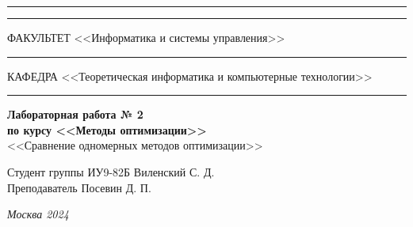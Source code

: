 \documentclass[a4paper, 14pt]{extarticle}
\begin{document}
\begin{titlepage}
\vspace{-25pt}
\hspace{-35pt}\rule{\textwidth}{2.3pt}

\vspace*{-20.3pt}
\hspace{-35pt}\rule{\textwidth}{0.4pt}

\vspace{1.5ex}
\hspace{-35pt} \noindent \small ФАКУЛЬТЕТ\hspace{80pt} <<Информатика и системы управления>>

\vspace*{-16pt}
\hspace{47pt}\rule{0.83\textwidth}{0.4pt}

\vspace{0.5ex}
\hspace{-35pt} \noindent \small КАФЕДРА\hspace{50pt} <<Теоретическая информатика и компьютерные технологии>>

\vspace*{-16pt}
\hspace{30pt}\rule{0.866\textwidth}{0.4pt}
  
\vspace{11em}

\begin{center}
\Large {\bf Лабораторная работа № 2} \\ 
\large {\bf по курсу <<Методы оптимизации>>} \\
\large <<Сравнение одномерных методов оптимизации>> 
\end{center}\normalsize

\vspace{8em}


\begin{flushright}
  {Студент группы ИУ9-82Б Виленский С. Д. \hspace*{15pt}\\ 
  \vspace{2ex}
  Преподаватель Посевин Д. П.\hspace*{15pt}}
\end{flushright}

\bigskip

\vfill
 

\begin{center}
\textsl{Москва 2024}
\end{center}
\end{titlepage}
\end{document}
